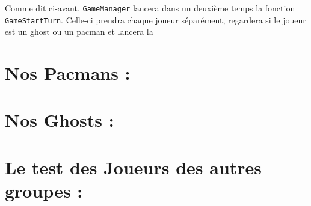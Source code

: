 \documentclass[a4paper, 11pt]{article}
\begin{document}
Comme dit ci-avant, \texttt{GameManager} lancera dans un deuxième temps la fonction \texttt{GameStartTurn}.  Celle-ci prendra chaque joueur séparément, regardera si le joueur est un ghost ou un pacman et lancera la 

\section{Nos Pacmans :}

\section{Nos Ghosts :}

\section{Le test des Joueurs des autres groupes :}
\end{document}
